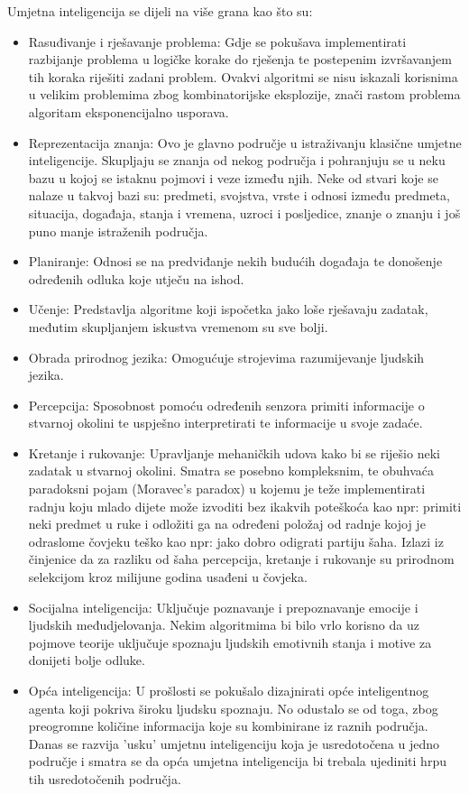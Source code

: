 Umjetna inteligencija se dijeli na više grana kao što su:
\begin{itemize}
	\item Rasuđivanje i rješavanje problema: Gdje se pokušava implementirati razbijanje problema u logičke korake do rješenja te postepenim izvršavanjem tih koraka riješiti zadani problem. Ovakvi algoritmi se nisu iskazali korisnima u velikim problemima zbog kombinatorijske eksplozije, znači rastom problema algoritam eksponencijalno usporava.
	
	\item Reprezentacija znanja: Ovo je glavno područje u istraživanju klasične umjetne inteligencije. Skupljaju se znanja od nekog područja i pohranjuju se u neku bazu u kojoj se istaknu pojmovi i veze između njih. Neke od stvari koje se nalaze u takvoj bazi su: predmeti, svojstva, vrste i odnosi između predmeta, situacija, događaja, stanja i vremena, uzroci i posljedice, znanje o znanju i još puno manje istraženih područja.
	
	\item Planiranje: Odnosi se na predviđanje nekih budućih događaja te donošenje određenih odluka koje utječu na ishod.
	
	\item Učenje: Predstavlja algoritme koji ispočetka jako loše rješavaju zadatak, međutim skupljanjem iskustva vremenom su sve bolji.
	
	\item Obrada prirodnog jezika: Omogućuje strojevima razumijevanje ljudskih jezika.
	
	\item Percepcija: Sposobnost pomoću određenih senzora primiti informacije o stvarnoj okolini te uspješno interpretirati te informacije u svoje zadaće.
	
	\item Kretanje i rukovanje: Upravljanje mehaničkih udova kako bi se riješio neki zadatak u stvarnoj okolini. Smatra se posebno kompleksnim, te obuhvaća paradoksni pojam (Moravec's paradox) u kojemu je teže implementirati radnju koju mlado dijete može izvoditi bez ikakvih poteškoća kao npr: primiti neki predmet u ruke i odložiti ga na određeni položaj od radnje kojoj je odraslome čovjeku teško kao npr: jako dobro odigrati partiju šaha. Izlazi iz činjenice da za razliku od šaha percepcija, kretanje i rukovanje su prirodnom selekcijom kroz milijune godina usađeni u čovjeka.
	
	\item Socijalna inteligencija: Uključuje poznavanje i prepoznavanje emocije i ljudskih međudjelovanja. Nekim algoritmima bi bilo vrlo korisno da uz pojmove teorije uključuje spoznaju ljudskih emotivnih stanja i motive za donijeti bolje odluke.
	
	\item Opća inteligencija: U prošlosti se pokušalo dizajnirati opće inteligentnog agenta koji pokriva široku ljudsku spoznaju. No odustalo se od toga, zbog preogromne količine informacija koje su kombinirane iz raznih područja. Danas se razvija 'usku' umjetnu inteligenciju koja je usredotočena u jedno područje i smatra se da opća umjetna inteligencija bi trebala ujediniti hrpu tih usredotočenih područja.
\end{itemize}

